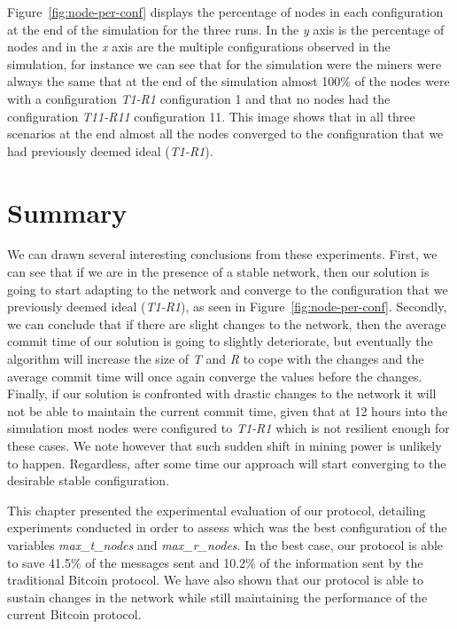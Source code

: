 Figure~\ref{fig:node-per-conf} displays the percentage of nodes in each configuration at the end of the simulation for the three runs. In the \emph{y} axis is the percentage of nodes and in the \emph{x} axis are the multiple configurations observed in the simulation, for instance we can see that for the simulation were the miners were always the same that at the end of the simulation almost 100\% of the nodes were with a configuration \textsl{T1-R1} configuration 1 and that no nodes had the configuration \textsl{T11-R11} configuration 11. This image shows that in all three scenarios at the end almost all the nodes converged to the configuration that we had previously deemed ideal (\textsl{T1-R1}).

\section{Summary}
\label{sec:evsum}

We can drawn several interesting conclusions from these experiments.
First, we can see that if we are in the presence of a stable network, then our solution is going to start adapting to the network and converge to the configuration that we previously deemed ideal (\textsl{T1-R1}), as seen in Figure~\ref{fig:node-per-conf}. Secondly, we can conclude that if there are slight changes to the network, then the average commit time of our solution is going to slightly deteriorate, but eventually the algorithm will increase the size of \textsl{T} and \textsl{R} to cope with the changes and the average commit time will once again converge the values before the changes. Finally, if our solution is confronted with drastic changes to the network it will not be able to maintain the current commit time, given that at 12 hours into the simulation most nodes were configured to \textsl{T1-R1} which is not resilient enough for these cases.
We note however that such sudden shift in mining power is unlikely to happen.
Regardless, after some time our approach will start converging to the desirable stable configuration.


This chapter presented the experimental evaluation of our protocol, detailing experiments conducted in order to assess which was the best configuration of the variables \textsl{max\_t\_nodes} and \textsl{max\_r\_nodes}. In the best case, our protocol is able to save 41.5\% of the messages sent and 10.2\% of the information sent by the traditional Bitcoin protocol. We have also shown that our protocol is able to sustain changes in the network while still maintaining the performance of the current Bitcoin protocol.

